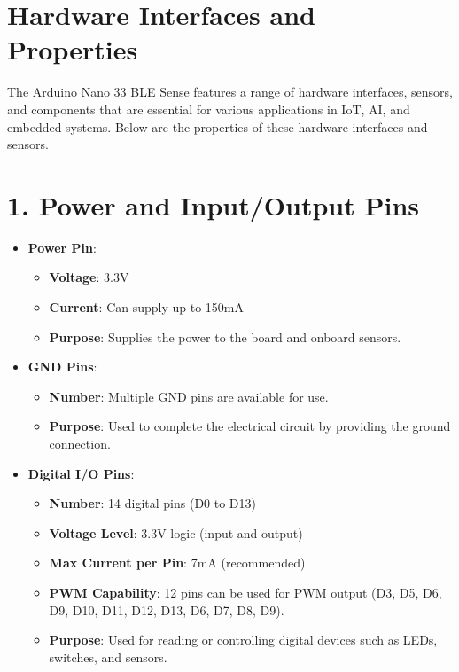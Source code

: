 	\section{Hardware Interfaces and Properties}
	
	The Arduino Nano 33 BLE Sense features a range of hardware interfaces, sensors, and components that are essential for various applications in IoT, AI, and embedded systems. Below are the properties of these hardware interfaces and sensors.
	
	\section*{1. Power and Input/Output Pins}
	
	\begin{itemize}
		\item \textbf{Power Pin}:
		\begin{itemize}
			\item \textbf{Voltage}: 3.3V
			\item \textbf{Current}: Can supply up to 150mA
			\item \textbf{Purpose}: Supplies the power to the board and onboard sensors.
		\end{itemize}
		
		\item \textbf{GND Pins}:
		\begin{itemize}
			\item \textbf{Number}: Multiple GND pins are available for use.
			\item \textbf{Purpose}: Used to complete the electrical circuit by providing the ground connection.
		\end{itemize}
		
		\item \textbf{Digital I/O Pins}:
		\begin{itemize}
			\item \textbf{Number}: 14 digital pins (D0 to D13)
			\item \textbf{Voltage Level}: 3.3V logic (input and output)
			\item \textbf{Max Current per Pin}: 7mA (recommended)
			\item \textbf{PWM Capability}: 12 pins can be used for PWM output (D3, D5, D6, D9, D10, D11, D12, D13, D6, D7, D8, D9).
			\item \textbf{Purpose}: Used for reading or controlling digital devices such as LEDs, switches, and sensors.
		\end{itemize}
		

\end{itemize}
